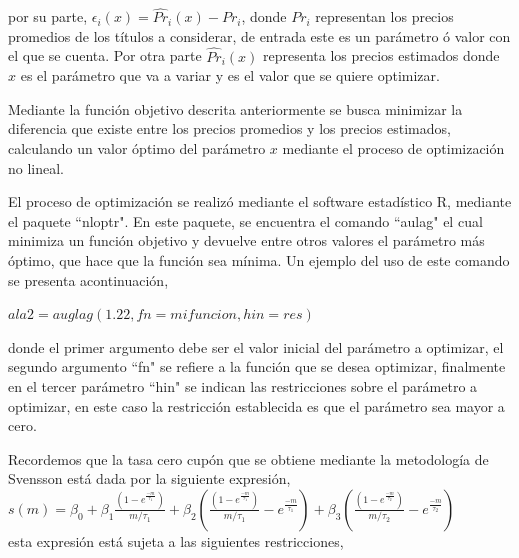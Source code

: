 \noindent por su parte, $\epsilon_{i}(x)= \hat{Pr}_{i}(x)-Pr_{i}$, donde $Pr_{i}$ representan los precios promedios de los t\'itulos a considerar, de entrada este es un par\'ametro \'o valor con el que se cuenta. Por otra parte $\hat{Pr}_{i}(x)$ representa los precios estimados donde $x$ es el par\'ametro que va a variar y es el valor que se quiere optimizar.


\hspace{0.4cm} Mediante la funci\'on objetivo descrita anteriormente se busca minimizar la diferencia que existe entre los precios promedios y los precios estimados, calculando un valor \'optimo del par\'ametro $x$ mediante el proceso de optimizaci\'on no lineal.



\hspace{0.4cm}El proceso de optimizaci\'on se realiz\'o mediante el software estad\'istico R, mediante el paquete ``nloptr". En este paquete, se encuentra el comando ``aulag" el cual minimiza un funci\'on objetivo y devuelve entre otros valores el par\'ametro m\'as \'optimo, que hace que la funci\'on sea m\'inima. Un ejemplo del uso de este comando se presenta acontinuaci\'on,

\begin{center}
  $ala2=auglag(1.22, fn=mifuncion, hin=res)$
\end{center}


\noindent donde el primer argumento debe ser el valor inicial del par\'ametro a optimizar, el segundo argumento ``fn" se refiere a la funci\'on que se desea optimizar, finalmente en el tercer par\'ametro ``hin" se indican las restricciones sobre el par\'ametro a optimizar, en este caso la restricci\'on establecida es que el par\'ametro sea mayor a cero.


\hspace{0.4cm} Recordemos que la tasa cero cup\'on que se obtiene mediante la metodolog\'ia de Svensson est\'a dada por la siguiente expresi\'on,\\


$\displaystyle{s(m) = \beta_{0}+ \beta_{1}\frac{\left(1-e^\frac{-m}{\tau_{1}}\right)}{m/\tau_{1}} + \beta_{2} \left(\frac{\left(1-e^\frac{-m}{\tau_{1}}\right)}{m/\tau_{1}} -  e^\frac{-m}{\tau_{1}}\right) + \beta_{3} \left(\frac{\left(1-e^\frac{-m}{\tau_{2}}\right)}{m/\tau_{2}} -  e^\frac{-m}{\tau_{2}}\right)}$\\

\noindent esta expresi\'on est\'a sujeta a las siguientes restricciones,

